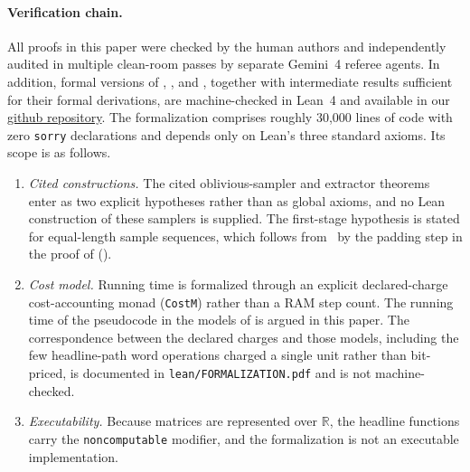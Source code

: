 \documentclass[11pt]{article}
\theoremstyle{definition}
\newcommand{\R}{\mathbb{R}}
\begin{document}
\paragraph{Verification chain.}
All proofs in this paper were checked by the human authors and independently audited in multiple clean-room passes by separate Gemini~4 referee agents. In addition, formal versions of , , and , together with intermediate results sufficient for their formal derivations, are machine-checked in Lean~4 and available in our \href{https://github.com/lockqueue/bmm}{github repository}. The formalization comprises roughly 30{,}000 lines of code with zero \texttt{sorry} declarations and depends only on Lean's three standard axioms. Its scope is as follows.
\begin{enumerate}[label=(\roman*), leftmargin=*]
    \item \emph{Cited constructions.} The cited oblivious-sampler and extractor theorems~\cite{GoldreichW97,AFKLM24,GUV09,Vadhan12} enter as two explicit hypotheses rather than as global axioms, and no Lean construction of these samplers is supplied. The first-stage hypothesis is stated for equal-length sample sequences, which follows from~\cite[Lemma~4.4]{AFKLM24} by the padding step in the proof of  ().
    \item \emph{Cost model.} Running time is formalized through an explicit declared-charge cost-accounting monad (\texttt{CostM}) rather than a RAM step count. The running time of the pseudocode in the models of  is argued in this paper. The correspondence between the declared charges and those models, including the few headline-path word operations charged a single unit rather than bit-priced, is documented in \texttt{lean/FORMALIZATION.pdf} and is not machine-checked.
    \item \emph{Executability.} Because matrices are represented over $\R$, the headline functions carry the \texttt{noncomputable} modifier, and the formalization is not an executable implementation.

\end{enumerate}
\end{document}

